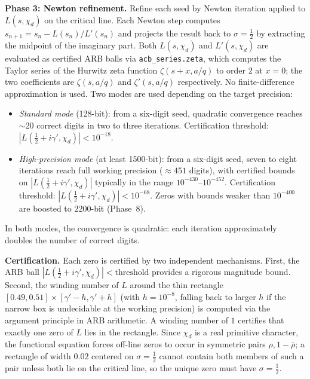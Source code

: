 \documentclass[12pt,reqno]{amsart}
\theoremstyle{plain}
\theoremstyle{definition}
\theoremstyle{remark}
\begin{document}
\medskip\noindent\textbf{Phase 3: Newton refinement.}  Refine each seed by Newton iteration applied to $L(s, \chi_d)$ on the critical line.  Each Newton step computes $s_{n+1} = s_n - L(s_n)/L'(s_n)$ and projects the result back to $\sigma = \tfrac{1}{2}$ by extracting the midpoint of the imaginary part.  Both $L(s, \chi_d)$ and $L'(s, \chi_d)$ are evaluated as certified ARB balls via \texttt{acb\_series.zeta}, which computes the Taylor series of the Hurwitz zeta function $\zeta(s + x, a/q)$ to order $2$ at $x = 0$; the two coefficients are $\zeta(s, a/q)$ and $\zeta'(s, a/q)$ respectively.  No finite-difference approximation is used.  Two modes are used depending on the target precision:
\begin{itemize}
\item \emph{Standard mode} (128-bit): from a six-digit seed, quadratic convergence reaches $\sim$20 correct digits in two to three iterations.  Certification threshold: $|L(\tfrac{1}{2}+i\gamma', \chi_d)| < 10^{-18}$.
\item \emph{High-precision mode} (at least 1500-bit): from a six-digit seed, seven to eight iterations reach full working precision ($\approx 451$ digits), with certified bounds on $|L(\tfrac{1}{2}+i\gamma', \chi_d)|$ typically in the range $10^{-430}$--$10^{-452}$.  Certification threshold: $|L(\tfrac{1}{2}+i\gamma', \chi_d)| < 10^{-68}$.  Zeros with bounds weaker than $10^{-400}$ are boosted to $2200$-bit (Phase~8).
\end{itemize}
In both modes, the convergence is quadratic: each iteration approximately doubles the number of correct digits.

\medskip\noindent\textbf{Certification.}  Each zero is certified by two independent mechanisms.  First, the ARB ball $|L(\tfrac{1}{2}+i\gamma', \chi_d)| < \text{threshold}$ provides a rigorous magnitude bound.  Second, the winding number of $L$ around the thin rectangle $[0.49, 0.51] \times [\gamma' - h, \gamma' + h]$ (with $h = 10^{-8}$, falling back to larger $h$ if the narrow box is undecidable at the working precision) is computed via the argument principle in ARB arithmetic.  A winding number of $1$ certifies that exactly one zero of $L$ lies in the rectangle.  Since $\chi_d$ is a real primitive character, the functional equation forces off-line zeros to occur in symmetric pairs $\rho, 1 - \bar\rho$; a rectangle of width $0.02$ centered on $\sigma = \tfrac{1}{2}$ cannot contain both members of such a pair unless both lie on the critical line, so the unique zero must have $\sigma = \tfrac{1}{2}$.
\end{document}
